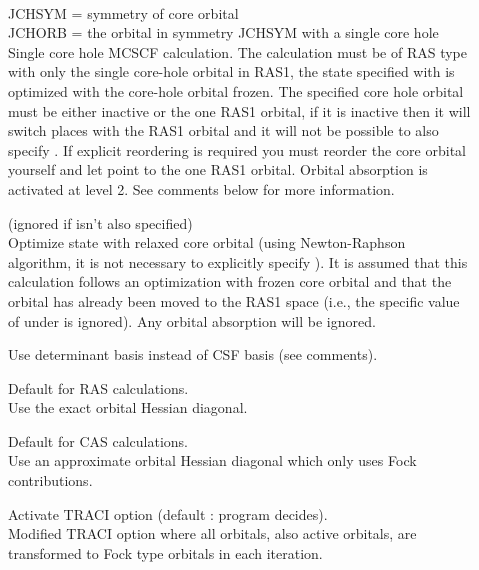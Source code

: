 \begin{description}
\item[]
   \\
  JCHSYM = symmetry of core orbital\\
  JCHORB = the orbital in symmetry JCHSYM with a single core hole\\
  Single core hole MCSCF calculation. The calculation must be of RAS type
  with only the single core-hole orbital in RAS1, the state specified with
   is optimized with the core-hole orbital
  frozen.
  The specified core hole orbital must be either inactive or
  the one RAS1 orbital, if it is inactive then it will switch places with
  the RAS1 orbital and it will not be possible to also
  specify . If explicit reordering is required you must reorder
  the core orbital yourself and let  point to the one RAS1 orbital.
  Orbital absorption is activated at level 2. See comments below for more information.

\item[]
  (ignored if  isn't also specified)\\
  Optimize state with relaxed core orbital (using Newton-Raphson algorithm,
  it is not necessary to explicitly specify ).
  It is assumed that this calculation follows an optimization
  with frozen core orbital and that the orbital has already been
  moved to the RAS1 space (i.e., the specific value of
   under  is ignored). Any
  orbital absorption   will be ignored.

\item[]
  Use determinant basis instead of CSF basis (see comments).

\item[]
  Default for RAS calculations.\\
  Use the exact orbital Hessian diagonal.

\item[]
  Default for CAS calculations.\\
  Use an approximate orbital Hessian diagonal which only uses Fock
  contributions.

\item[]
  Activate TRACI option (default : program decides).\\
  Modified TRACI option where all orbitals, also active orbitals, are
  transformed to Fock type orbitals in each iteration.


\end{description}
